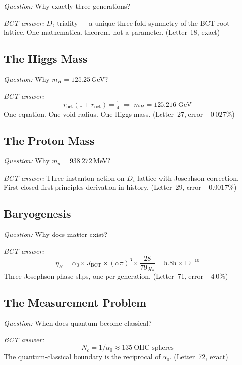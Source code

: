 \documentclass[aps,prl,twocolumn,superscriptaddress,floatfix]{revtex4-2}
\begin{document}
\noindent\textit{Question:} Why exactly three generations?

\noindent\textit{BCT answer:} $D_4$ triality --- a unique
three-fold symmetry of the BCT root lattice. One mathematical
theorem, not a parameter. (Letter~18, exact)

\subsection{The Higgs Mass}

\noindent\textit{Question:} Why $m_H = 125.25$\,GeV?

\noindent\textit{BCT answer:}
\begin{equation}
  r_\mathrm{oct}(1 + r_\mathrm{oct}) = \tfrac{1}{4}
  \;\Rightarrow\; m_H = 125.216\;\mathrm{GeV}
\end{equation}
One equation. One void radius. One Higgs mass.
(Letter~27, error $-0.027\%$)

\subsection{The Proton Mass}

\noindent\textit{Question:} Why $m_p = 938.272$\,MeV?

\noindent\textit{BCT answer:} Three-instanton action on $D_4$
lattice with Josephson correction. First closed first-principles
derivation in history. (Letter~29, error $-0.0017\%$)

\subsection{Baryogenesis}

\noindent\textit{Question:} Why does matter exist?

\noindent\textit{BCT answer:}
\begin{equation}
  \eta_B = \alpha_0 \times J_\mathrm{BCT} \times (\alpha\pi)^3
  \times \frac{28}{79\,g_*}
  = 5.85 \times 10^{-10}
\end{equation}
Three Josephson phase slips, one per generation.
(Letter~71, error $-4.0\%$)

\subsection{The Measurement Problem}

\noindent\textit{Question:} When does quantum become classical?

\noindent\textit{BCT answer:}
\begin{equation}
  N_c = 1/\alpha_0 \approx 135 \;\text{OHC spheres}
\end{equation}
The quantum-classical boundary is the reciprocal of $\alpha_0$.
(Letter~72, exact)
\end{document}
